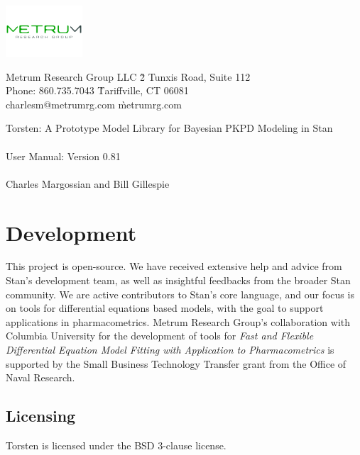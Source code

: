 \documentclass[11pt]{amsart}
\let\oldsection\section
\renewcommand\section{\clearpage\oldsection}
\begin{document}
\begin{center}
\includegraphics[height=0.75in]{graphics/logo.pdf}\\
\textcolor{MRGGreen}{\sf
\begin{tabbing}
Metrum Research Group LLC \` 2 Tunxis Road, Suite 112 \\
Phone: 860.735.7043 \` Tariffville, CT 06081 \\
charlesm@metrumrg.com \` metrumrg.com \\
\end{tabbing}
}
{\Huge Torsten: A Prototype Model Library for Bayesian PKPD Modeling in Stan \\ \ \\
User Manual: Version 0.81 \\ \ \\
\large Charles Margossian and Bill Gillespie}
\end{center}

\section*{Development}
This project is open-source. We have received extensive help and advice from Stan's development team, as well as insightful feedbacks from the broader Stan community. We are active contributors to Stan's core language, and our focus is on tools for differential equations based models, with the goal to support applications in pharmacometrics. Metrum Research Group's collaboration with Columbia University for the development of tools for \textit{Fast and Flexible Differential Equation Model Fitting with Application to Pharmacometrics} is supported by the Small Business Technology Transfer grant from the Office of Naval Research.

\subsection*{Licensing}
Torsten is licensed under the BSD 3-clause license.
\end{document}
